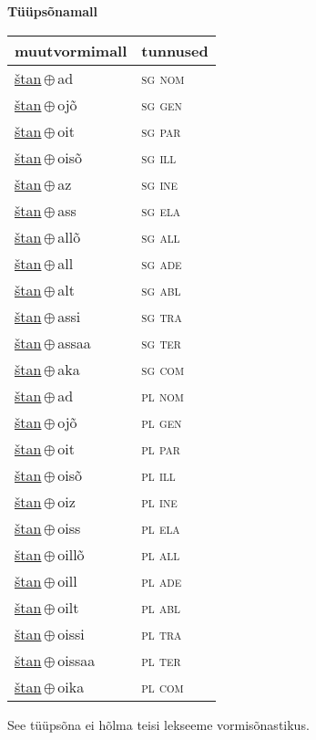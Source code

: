 

\vspace{3.5em}
\noindent \begin{minipage}{\textwidth}
\noindent \textbf{Tüüpsõnamall \,}\\

\begin{sideways}
\begin{tabular}{l l}
muutvormimall & tunnused \\
\hline
\underline{štan}\,$\oplus$\,ad & \textsc{ sg nom } \\
\underline{štan}\,$\oplus$\,ojõ & \textsc{ sg gen } \\
\underline{štan}\,$\oplus$\,oit & \textsc{ sg par } \\
\underline{štan}\,$\oplus$\,oisõ & \textsc{ sg ill } \\
\underline{štan}\,$\oplus$\,az & \textsc{ sg ine } \\
\underline{štan}\,$\oplus$\,ass & \textsc{ sg ela } \\
\underline{štan}\,$\oplus$\,allõ & \textsc{ sg all } \\
\underline{štan}\,$\oplus$\,all & \textsc{ sg ade } \\
\underline{štan}\,$\oplus$\,alt & \textsc{ sg abl } \\
\underline{štan}\,$\oplus$\,assi & \textsc{ sg tra } \\
\underline{štan}\,$\oplus$\,assaa & \textsc{ sg ter } \\
\underline{štan}\,$\oplus$\,aka & \textsc{ sg com } \\
\underline{štan}\,$\oplus$\,ad & \textsc{ pl nom } \\
\underline{štan}\,$\oplus$\,ojõ & \textsc{ pl gen } \\
\underline{štan}\,$\oplus$\,oit & \textsc{ pl par } \\
\underline{štan}\,$\oplus$\,oisõ & \textsc{ pl ill } \\
\underline{štan}\,$\oplus$\,oiz & \textsc{ pl ine } \\
\underline{štan}\,$\oplus$\,oiss & \textsc{ pl ela } \\
\underline{štan}\,$\oplus$\,oillõ & \textsc{ pl all } \\
\underline{štan}\,$\oplus$\,oill & \textsc{ pl ade } \\
\underline{štan}\,$\oplus$\,oilt & \textsc{ pl abl } \\
\underline{štan}\,$\oplus$\,oissi & \textsc{ pl tra } \\
\underline{štan}\,$\oplus$\,oissaa & \textsc{ pl ter } \\
\underline{štan}\,$\oplus$\,oika & \textsc{ pl com } \\
\end{tabular}
\end{sideways}
\label{tab:tüüpsõnamall-štanad}

\end{minipage}

 
\vspace{1em}
\noindent See tüüpsõna ei hõlma teisi lekseeme vormi\-sõnastikus.
